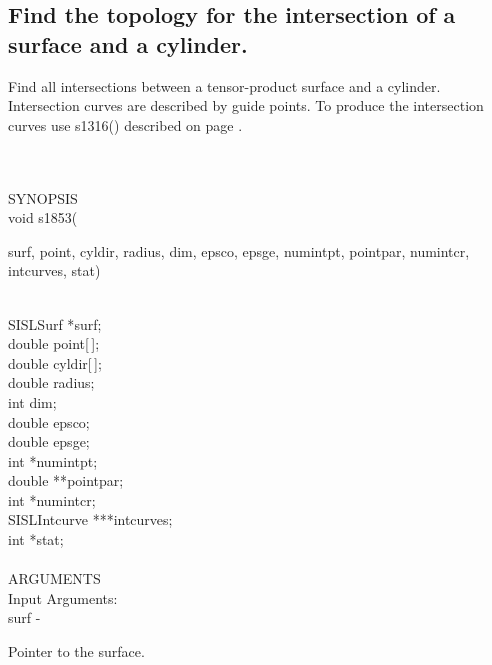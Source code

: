 \subsection{Find the topology for the intersection of a surface and a cylinder.}
\begin{minipg1}
  Find all intersections between a tensor-product surface and a cylinder.
  Intersection curves are described by guide points.
  To produce the intersection curves use s1316() described on page \pageref{s1316}.
\end{minipg1} \\ \\
SYNOPSIS\\
        \>void s1853(\begin{minipg3}
                        {\fov surf}, {\fov point}, {\fov cyldir}, {\fov radius}, {\fov dim}, {\fov epsco},
                        {\fov epsge}, {\fov numintpt}, \linebreak
                        {\fov pointpar}, {\fov numintcr}, {\fov intcurves}, {\fov stat})
                \end{minipg3}\\[0.3ex]
                \>\>    SISLSurf        \>      *{\fov surf};\\
                \>\>    double  \>      {\fov point}[\,];\\
                \>\>    double  \>      {\fov cyldir}[\,];\\
                \>\>    double  \>      {\fov radius};\\
                \>\>    int     \>      {\fov dim};\\
                \>\>    double  \>      {\fov epsco};\\
                \>\>    double  \>      {\fov epsge};\\
                \>\>    int     \>      *{\fov numintpt};\\
                \>\>    double  \>      **{\fov pointpar};\\
                \>\>    int     \>      *{\fov numintcr};\\
                \>\>    SISLIntcurve\>  ***{\fov intcurves};\\
                \>\>    int     \>      *{\fov stat};\\
\\
ARGUMENTS\\
        \>Input Arguments:\\
        \>\>    {\fov surf}\> - \>      \begin{minipg2}
                                Pointer to the surface.
                                \end{minipg2}\\

